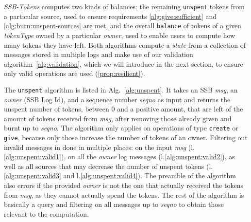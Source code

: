 \documentclass[sigplan,screen,10pt]{acmart}
\newcommand\ssbtokens[0]{\textit{SSB-Tokens} }
\begin{document}
\ssbtokens computes two kinds of balances: the remaining \texttt{unspent} tokens from a particular source, used to ensure requirements \ref{alg:give:sufficient} and \ref{alg:burn:unspent-sources} are met, and the overall \texttt{balance} of tokens of a given \textit{tokenType} owned by a particular \textit{owner}, used to enable users to compute how many tokens they have left. Both algorithms compute a \textit{state} from a collection of messages stored in multiple logs and make use of our validation algorithm~\ref{alg:validation}, which we will introduce in the next section, to ensure only valid operations are used (\ref{prop:resilient}).

The \texttt{unspent} algorithm is listed in Alg.~\ref{alg:unspent}. It takes an SSB \textit{msg}, an \textit{owner} (SSB Log Id), and a sequence number \textit{seqno} as input and returns the unspent number of tokens, between 0 and a positive amount, that are left of the amount of tokens received from \textit{msg}, after removing those already given and burnt up to \textit{seqno}. The algorithm only applies on operations of type \texttt{create} or \texttt{give}, because only those increase the number of tokens of an owner. Filtering out invalid messages in done in multiple places: on the input \textit{msg} (l.\ref{alg:unspent:valid1}), on all the \textit{owner} log messages (l.\ref{alg:unspent:valid2}), as well as all sources that may decrease the number of unspent tokens (l.\ref{alg:unspent:valid3} and l.\ref{alg:unspent:valid4}). The preamble of the algorithm also errors if the provided \textit{owner} is not the one that actually received the tokens from \textit{msg}, as they cannot actually spend the tokens. The rest of the algorithm is basically a query and filtering on all messages up to \textit{seqno} to obtain those relevant to the computation.
\end{document}
